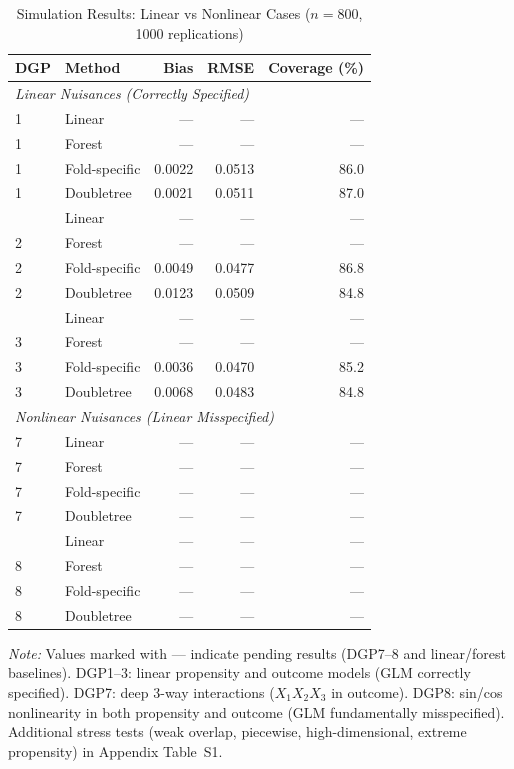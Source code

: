 \documentclass[12pt]{article}
\begin{document}
\begin{table}[htbp]
\centering
\caption{Simulation Results: Linear vs Nonlinear Cases ($n=800$, 1000 replications)}
\label{tab:sim_results_main}
\begin{tabular}{llrrr}
\toprule
DGP & Method & Bias & RMSE & Coverage (\%) \\
\midrule
\multicolumn{5}{l}{\textit{Linear Nuisances (Correctly Specified)}} \\
1 & Linear & --- & --- & --- \\
1 & Forest & --- & --- & --- \\
1 & Fold-specific & 0.0022 & 0.0513 & 86.0 \\
1 & Doubletree & 0.0021 & 0.0511 & 87.0 \\
\addlinespace
2 & Linear & --- & --- & --- \\
2 & Forest & --- & --- & --- \\
2 & Fold-specific & 0.0049 & 0.0477 & 86.8 \\
2 & Doubletree & 0.0123 & 0.0509 & 84.8 \\
\addlinespace
3 & Linear & --- & --- & --- \\
3 & Forest & --- & --- & --- \\
3 & Fold-specific & 0.0036 & 0.0470 & 85.2 \\
3 & Doubletree & 0.0068 & 0.0483 & 84.8 \\
\midrule
\multicolumn{5}{l}{\textit{Nonlinear Nuisances (Linear Misspecified)}} \\
7 & Linear & --- & --- & --- \\
7 & Forest & --- & --- & --- \\
7 & Fold-specific & --- & --- & --- \\
7 & Doubletree & --- & --- & --- \\
\addlinespace
8 & Linear & --- & --- & --- \\
8 & Forest & --- & --- & --- \\
8 & Fold-specific & --- & --- & --- \\
8 & Doubletree & --- & --- & --- \\
\bottomrule
\end{tabular}
\begin{tablenotes}
\small
\item \textit{Note:} Values marked with --- indicate pending results (DGP7--8 and linear/forest baselines).
DGP1--3: linear propensity and outcome models (GLM correctly specified). DGP7: deep 3-way interactions
($X_1 X_2 X_3$ in outcome). DGP8: sin/cos nonlinearity in both propensity and outcome (GLM fundamentally
misspecified). Additional stress tests (weak overlap, piecewise, high-dimensional, extreme propensity)
in Appendix Table~S1.
\end{tablenotes}
\end{table}
\end{document}
